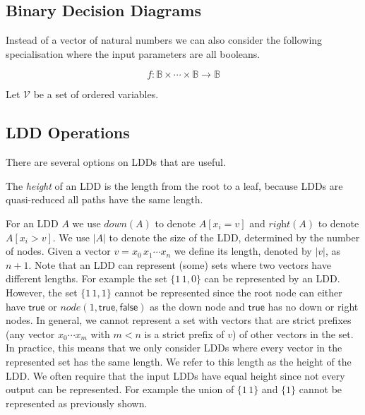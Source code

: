 \documentclass[a4paper]{article}
\newcommand{\var}[1]{\textit{#1}}
\newcommand{\variables}{\mathcal{V}}
\newcommand{\booleans}{\mathbb{B}}
\begin{document}
\subsection{Binary Decision Diagrams}

Instead of a vector of natural numbers we can also consider the following specialisation where the input parameters are all booleans.

\begin{equation*}
  f: \booleans \times \cdots \times \booleans \rightarrow \booleans
\end{equation*}

Let $\variables$ be a set of ordered variables.


\subsection{LDD Operations}

There are several options on LDDs that are useful.

The \emph{height} of an LDD is the length from the root to a leaf, because LDDs are quasi-reduced all paths have the same length.


\newcommand{\lddnode}{\textsf{node}}
\newcommand{\lddright}{\textit{right}}
\newcommand{\ldddown}{\textit{down}}
\newcommand{\lddval}{\textit{val}}
\newcommand{\lddtrue}{\textsf{true}}
\newcommand{\lddfalse}{\textsf{false}}

For an LDD $A$ we use $\ldddown(A)$ to denote $A[x_i = v]$ and $\lddright(A)$ to denote $A[x_i > v]$.
We use $|A|$ to denote the size of the LDD, determined by the number of nodes.
Given a vector $v = x_0\,x_1 \cdots x_n$ we define its length, denoted by $|v|$, as $n + 1$.
Note that an LDD can represent (some) sets where two vectors have different lengths.
For example the set $\{1\,1, 0\}$ can be represented by an LDD.
However, the set $\{1\,1, 1\}$ cannot be represented since the root node can either have $\textsf{true}$ or $\var{node}(1, \textsf{true}, \textsf{false})$ as the down node and $\textsf{true}$ has no down or right nodes.
In general, we cannot represent a set with vectors that are strict prefixes (any vector $x_0 \cdots x_m$ with $m < n$ is a strict prefix of $v$) of other vectors in the set.
In practice, this means that we only consider LDDs where every vector in the represented set has the same length.
We refer to this length as the height of the LDD.
We often require that the input LDDs have equal height since not every output can be represented.
For example the union of $\{1\,1\}$ and $\{1\}$ cannot be represented as previously shown.
\end{document}
